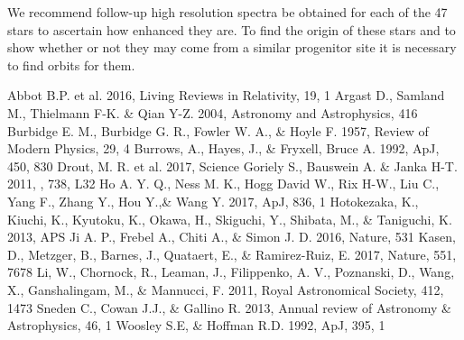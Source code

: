 \documentclass[a4paper,fleqn,usenatbib]{mnras}
\begin{document}
	We recommend follow-up high resolution spectra be obtained for each of the 47 stars to ascertain how enhanced they are. To find the origin of these stars and to show whether or not they may come from a similar progenitor site it is necessary to find orbits for them.
	
	
	
	
	\begin{thebibliography}{99}
		Abbot B.P. et al. 2016, Living Reviews in Relativity, 19, 1
		Argast D., Samland M., Thielmann F-K. \& Qian Y-Z. 2004, Astronomy and Astrophysics, 416
		Burbidge E. M., Burbidge G. R., Fowler W. A., \& Hoyle F. 1957, Review of Modern Physics, 29, 4
		Burrows, A., Hayes, J., \& Fryxell, Bruce A. 1992, ApJ, 450, 830
		Drout, M. R. et al. 2017, Science
		Goriely S., Bauswein A. \& Janka H-T. 2011, , 738, L32
		Ho A. Y. Q., Ness M. K., Hogg David W., Rix H-W., Liu C., Yang F., Zhang Y., Hou Y.,\& Wang Y. 2017, ApJ, 836, 1
		Hotokezaka, K., Kiuchi, K., Kyutoku, K., Okawa, H., Skiguchi, Y., Shibata, M., \& Taniguchi, K. 2013, APS
		Ji A. P., Frebel A., Chiti A., \& Simon J. D. 2016, Nature, 531
		Kasen, D., Metzger, B., Barnes, J., Quataert, E., \& Ramirez-Ruiz, E. 2017, Nature, 551, 7678
		Li, W., Chornock, R., Leaman, J., Filippenko, A. V., Poznanski, D., Wang, X., Ganshalingam, M., \& Mannucci, F. 2011, Royal Astronomical Society, 412, 1473
		Sneden C., Cowan J.J., \& Gallino R. 2013, Annual review of Astronomy \& Astrophysics, 46, 1
		Woosley S.E, \& Hoffman R.D. 1992, ApJ, 395, 1
	\end{thebibliography}
	
\end{document}
